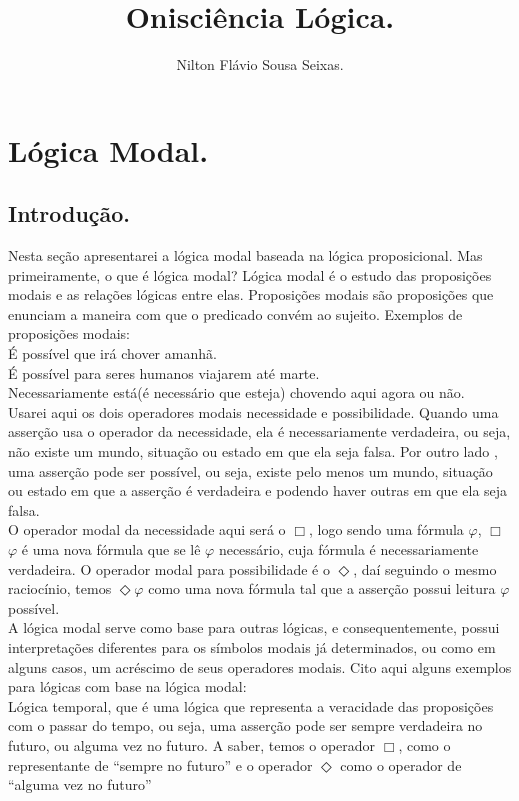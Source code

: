 \documentclass[12pt]{report}
\title{Onisciência Lógica.}
\author{Nilton Flávio Sousa Seixas.}
\begin{document}
\maketitle
\tableofcontents
\chapter{Lógica Modal.}
  \section{Introdução.}
     \hspace{0.5cm} Nesta seção apresentarei a lógica modal baseada na lógica proposicional. Mas primeiramente, o que é lógica modal? Lógica modal é o estudo das proposições modais e as relações lógicas entre elas. Proposições modais são proposições que enunciam a maneira com que o predicado convém ao sujeito. Exemplos de proposições modais:\\
	\indent É possível que irá chover amanhã.\\
	\indent É possível para seres humanos viajarem até marte.\\
	\indent Necessariamente está(é necessário que esteja) chovendo aqui agora ou não.\\
       \indent Usarei aqui os dois operadores modais necessidade e possibilidade. Quando uma asserção usa o operador da necessidade, ela é necessariamente verdadeira, ou seja, não existe um mundo, situação ou estado em que ela seja falsa. Por outro lado , uma asserção pode ser possível, ou seja, existe pelo menos um mundo,  situação ou estado em que a asserção é verdadeira e podendo haver outras em que ela seja falsa. \\
       \indent  O operador modal da necessidade aqui será o $\Box$, logo sendo uma fórmula $\varphi$, $\Box$$\varphi$ é uma nova fórmula que se lê $\varphi$ necessário, cuja fórmula é necessariamente verdadeira. O operador modal para possibilidade é o $\Diamond$, daí seguindo o mesmo raciocínio, temos $\Diamond$$\varphi$ como uma nova fórmula tal que a asserção possui leitura $\varphi$ possível.\\
     \indent A lógica modal serve como base para outras lógicas, e consequentemente, possui interpretações diferentes para os símbolos modais já determinados,  ou como em alguns casos, um acréscimo de seus operadores modais. Cito aqui alguns exemplos para lógicas com base na lógica modal:\\
         \indent Lógica temporal, que é uma lógica que representa a veracidade das proposições com o passar do tempo, ou seja, uma asserção pode ser sempre verdadeira no futuro, ou alguma vez no futuro. A saber, temos o operador $\Box$, como o representante de “sempre no futuro” e o operador $\Diamond$ como o operador de “alguma vez no futuro” \\
\end{document}
